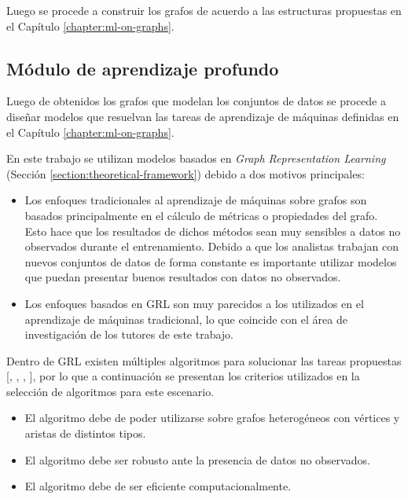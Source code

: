 Luego se procede a construir los grafos de acuerdo a las estructuras propuestas en el Cap\'itulo \ref{chapter:ml-on-graphs}.

\subsection{M\'odulo de aprendizaje profundo}

Luego de obtenidos los grafos que modelan los conjuntos de datos se procede
a dise\~nar modelos que resuelvan las tareas de aprendizaje de m\'aquinas definidas en el Cap\'itulo \ref{chapter:ml-on-graphs}.

En este trabajo se utilizan modelos basados en \textit{Graph Representation Learning} (Secci\'on \ref{section:theoretical-framework}) debido
a dos motivos principales:

\begin{itemize}
    \item Los enfoques tradicionales al aprendizaje de m\'aquinas sobre grafos son
    basados principalmente en el c\'alculo de m\'etricas o propiedades del grafo. Esto
    hace que los resultados de dichos m\'etodos sean muy sensibles a datos no observados
    durante el entrenamiento. Debido a que los analistas trabajan con nuevos conjuntos de datos
    de forma constante es importante utilizar modelos que puedan presentar buenos resultados con datos no observados.
    \item Los enfoques basados en GRL son muy parecidos
    a los utilizados en el aprendizaje de m\'aquinas tradicional, lo que coincide con el
    \'area de investigaci\'on de los tutores de este trabajo.
\end{itemize}

Dentro de GRL existen m\'ultiples algoritmos para solucionar las tareas propuestas [\cite*{hamilton2017representation}, \cite*{chami2022machine},  \cite*{cai2018comprehensive}, \cite*{nickel2015review}], por lo que a continuaci\'on se presentan
los criterios utilizados en la selecci\'on de algoritmos para este escenario.

\begin{itemize}
    \item El algoritmo debe de poder utilizarse sobre grafos heterog\'eneos con v\'ertices y aristas de distintos tipos.
    \item El algoritmo debe ser robusto ante la presencia de datos no observados.
    \item El algoritmo debe de ser eficiente computacionalmente.
\end{itemize}

